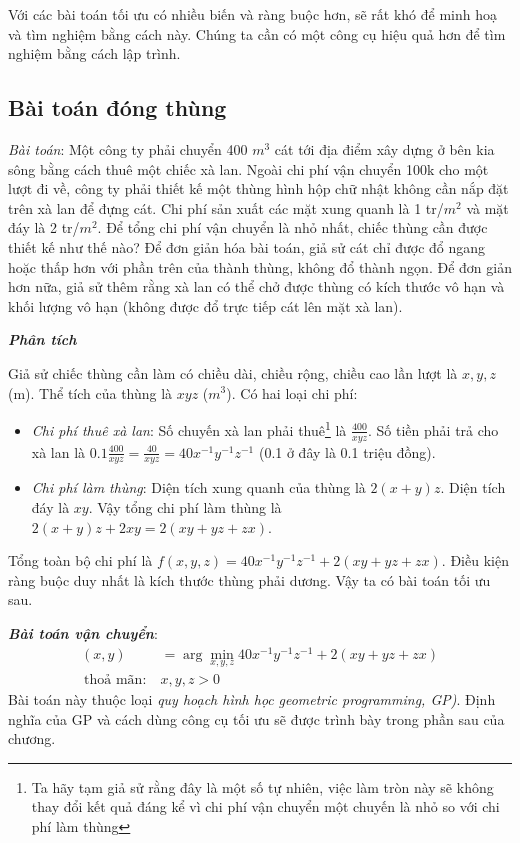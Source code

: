 Với các bài toán tối ưu có nhiều biến và ràng buộc hơn, sẽ rất khó để
minh hoạ và tìm nghiệm bằng cách này. Chúng ta cần có một công cụ hiệu quả hơn để tìm nghiệm bằng cách lập trình.

\subsection{Bài toán đóng thùng}

\textit{Bài toán}: Một công ty phải chuyển 400 $m^3$ cát tới địa điểm xây dựng ở
bên kia sông bằng
cách thuê một chiếc xà lan. Ngoài chi phí vận chuyển 100k cho một lượt đi về, công ty  phải thiết kế một thùng hình hộp chữ nhật không cần nắp đặt trên xà
lan để đựng cát. Chi phí sản xuất các mặt xung quanh
là 1 tr/$m^2$ và mặt đáy là 2 tr/$m^2$. Để tổng chi phí vận chuyển là nhỏ nhất, chiếc thùng cần được thiết kế như thế nào? Để đơn giản hóa bài toán, giả sử cát chỉ được
đổ ngang hoặc thấp hơn với phần trên của thành thùng, không đổ thành ngọn. Để đơn giản hơn nữa, giả sử thêm rằng xà lan có thể chở được thùng có kích thước vô hạn và khối lượng vô hạn (không được đổ trực tiếp cát lên mặt xà lan).


\textit{\textbf{Phân tích}}

Giả sử chiếc thùng cần làm có chiều dài, chiều rộng, chiều cao lần lượt là $x,
y, z$ (m). Thể tích của thùng là $xyz$ ($m^3$). Có hai loại chi phí:
\begin{itemize}
\item \textit{Chi phí thuê xà lan}: Số chuyến xà lan phải thuê\footnote{Ta
hãy tạm giả sử rằng đây là một số tự nhiên, việc làm tròn này sẽ không thay
đổi kết quả đáng kể vì chi phí vận chuyển một chuyến là nhỏ so với chi phí
làm thùng} là $\frac{400}{xyz}$. Số tiền phải trả cho xà lan là
$\displaystyle 0.1\frac{400}{xyz} = \frac{40}{xyz} = 40x^{-1}y^{-1}z^{-1}$
(0.1 ở đây là 0.1 triệu đồng).
\item \textit{Chi phí làm thùng}: Diện tích xung quanh của thùng là $2 (x +
y)z $. Diện tích đáy là $xy$. Vậy tổng chi phí làm thùng là $2(x +y)z + 2xy
= 2(xy + yz + zx)$.
\end{itemize}

Tổng toàn bộ chi phí là $f(x, y, z) = 40x^{-1}y^{-1}z^{-1} + 2(xy + yz + zx)$.
Điều kiện ràng buộc duy nhất là kích thước thùng phải dương. Vậy ta có
bài toán tối ưu sau.


\textit{\textbf{Bài toán vận chuyển}}:
\begin{equation}
\begin{aligned}
(x, y) &= \arg\min_{x, y, z} 40x^{-1}y^{-1}z^{-1} + 2(xy + yz + zx) \\\
\text{thoả mãn:}~ & x, y, z > 0
\end{aligned}
\end{equation}
Bài toán này thuộc loại \textit{quy hoạch hình học} \textit{{geometric programming, GP)}}. Định nghĩa của GP
và cách dùng công cụ tối ưu sẽ được trình bày trong phần sau của chương.

